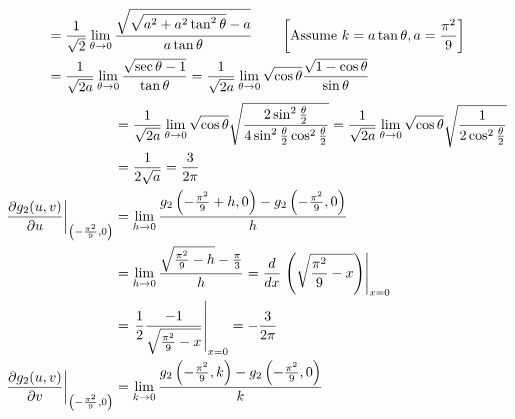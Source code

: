 \documentclass[a4paper, 11pt]{article}
\begin{document}
{\begin{enumerate}[label=(\alph*)]
\begin{align*}
			                                                               & = \frac1{\sqrt{2}}\lim_{\theta\to 0}\frac{\sqrt{\sqrt{a^2+a^2\tan^2\theta}-a }}{a\tan\theta}\qquad\left[\text{Assume }k=a\tan\theta,a=\frac{\pi^2}{9}\right]                \\
			                                                               & =\frac1{\sqrt{2a}}\lim_{\theta\to 0}\frac{\sqrt{\sec\theta-1}}{\tan\theta}=\frac1{\sqrt{2a}}\lim_{\theta\to 0}\sqrt{\cos\theta}\frac{\sqrt{1-\cos\theta}}{\sin\theta }
		      \end{align*}\begin{align*}
			      \qquad\qquad\quad                                        & = \frac1{\sqrt{2a}}\lim_{\theta\to 0} \sqrt{\cos\theta}\sqrt{\frac{2\sin^2\frac{\theta}{2}}{4\sin^2\frac{\theta}2\cos^2\frac{\theta}2}}=\frac1{\sqrt{2a}}\lim_{\theta\to 0} \sqrt{\cos\theta}\sqrt{\frac1{2\cos^2\frac{\theta}2}  }             \\
			                                                               & = \frac1{2\sqrt{a}}=\frac3{2\pi}                                                                                                                                                                                                                \\
			      \lt.\del{g_2(u,v)}{u}\rt|_{\lt( -\frac{\pi^2}{9}, 0\rt)} & =\lim_{h\to 0}\frac{g_2\lt(-\frac{\pi^2}{9}+h,0\rt) - g_2\lt(-\frac{\pi^2}{9},0\rt)}{h}                                                                                                                                                         \\
			                                                               & = \lim_{h\to 0} \frac{\sqrt{\frac{\pi^2}{9}-h}-\frac{\pi}{3}}{h}=\frac{d}{dx}\lt.\lt( \sqrt{\frac{\pi^2}{9}-x}\rt)\rt|_{x=0}                                                                                                                    \\
			                                                               & = \lt.\frac12 \frac{-1}{\sqrt{\frac{\pi^2}{9}-x}}\rt|_{x=0}=-\frac{3}{2\pi}                                                                                                                                                                     \\
			      \lt.\del{g_2(u,v)}{v}\rt|_{\lt( -\frac{\pi^2}{9}, 0\rt)} & =  \lim_{k\to 0 } \frac{g_2\lt(-\frac{\pi^2}{9},k\rt) - g_2\lt(-\frac{\pi^2}{9},0\rt)}{k}                                                                                                                                                       \\

\end{align*}
\end{enumerate}}
\end{document}
